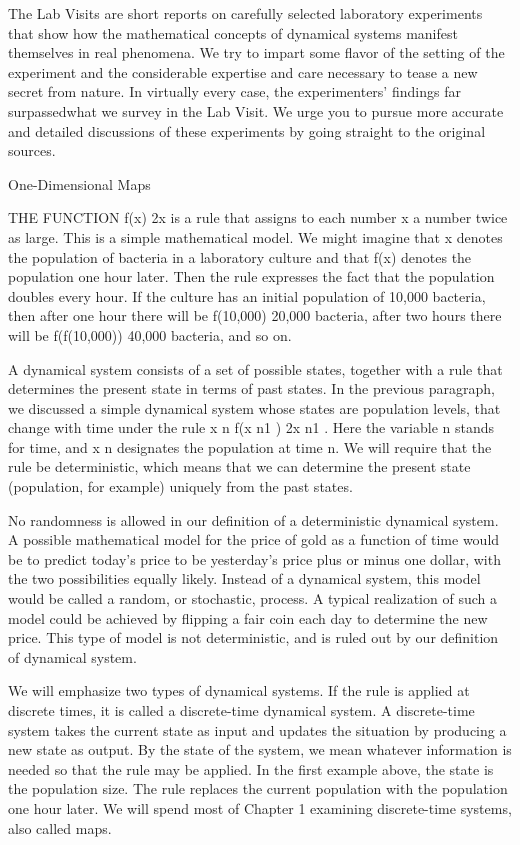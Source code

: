 \documentclass[12pt]{article}
\begin{document}
The Lab Visits are short reports on carefully selected laboratory experiments that show how the 
mathematical concepts of dynamical systems manifest themselves in real phenomena. We try to impart some 
flavor of the setting of the experiment and the considerable expertise and care necessary to tease a new 
secret from nature. In virtually every case, the experimenters’ findings far surpassedwhat we survey in the Lab Visit. We urge you to pursue more accurate and detailed discussions of these 
experiments by going straight to the original sources.

One-Dimensional Maps 

THE FUNCTION f(x)  2x is a rule that assigns to each number x a number twice as large. This is a simple 
mathematical model. We might imagine that x denotes the population of bacteria in a laboratory culture and 
that f(x) denotes the population one hour later. Then the rule expresses the fact that the population 
doubles every hour. If the culture has an initial population of 10,000 bacteria, then after one hour there 
will be f(10,000)  20,000 bacteria, after two hours there will be f(f(10,000))  40,000 bacteria, and so on.

A dynamical system consists of a set of possible states, together with a rule that determines the present 
state in terms of past states. In the previous paragraph, we discussed a simple dynamical system whose 
states are population levels, that change with time under the rule x n  f(x n1 )  2x n1 . Here the variable 
n stands for time, and x n designates the population at time n. We will require that the rule be 
deterministic, which means that we can determine the present state (population, 
for example) uniquely from the past states.

No randomness is allowed in our definition of a deterministic dynamical system. A possible mathematical 
model for the price of gold as a function of time would be to predict today’s price to be yesterday’s price 
plus or minus one dollar, with the two possibilities equally likely. Instead of a dynamical system, this 
model would be called a random, or stochastic, process. A typical realization of such a model could be 
achieved by flipping a fair coin each day to determine the new price. This type of model is not 
deterministic, and is ruled out by our definition of dynamical system.

We will emphasize two types of dynamical systems. If the rule is applied at discrete times, it is called a 
discrete-time dynamical system. A discrete-time system takes the current state as input and updates the 
situation by producing a new state as output. By the state of the system, we mean whatever information is 
needed so that the rule may be applied. In the first example above, the state is the population size. The 
rule replaces the current population with the population one hour later. We will spend most of Chapter 1 
examining discrete-time systems, also called maps.
\end{document}
